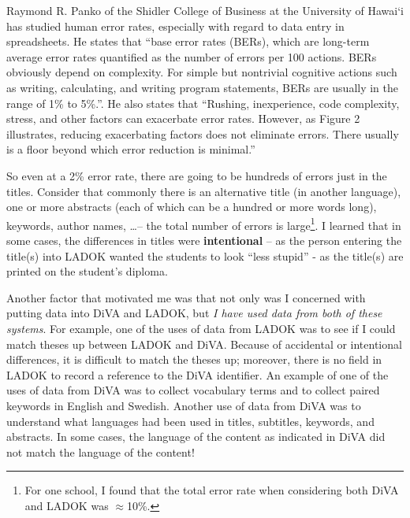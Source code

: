 \documentclass[12pt, twoside]{article}
\begin{document}
Raymond R. Panko of the Shidler College of Business at the University of Hawai`i has studied human error rates, especially with regard to data entry in spreadsheets. He states that  \enquote{base error rates (BERs), which are long-term average error rates quantified as the number of errors per 100 actions. BERs obviously depend on complexity. For simple but nontrivial cognitive actions such as writing, calculating, and writing program statements, BERs are usually in the range of 1\% to 5\%.}\cite{Panko2015}. He also states that \enquote{Rushing, inexperience, code complexity, stress, and other factors can exacerbate error rates. However,
as Figure 2 illustrates, reducing exacerbating factors does not eliminate errors. There usually is a floor beyond which error reduction is minimal.}

So even at a 2\% error rate, there are going to be hundreds of errors just in the titles. Consider that commonly there is an alternative title (in another language), one or more abstracts (each of which can be a hundred or more words long), keywords, author names, \ldots -- the total number of errors is large\footnote{For one school, I found that the total error rate when considering both \gls{DiVA} and \gls{LADOK} was $\approx$10\%.}. I learned that in some cases, the differences in titles were \textbf{intentional} -- as the person entering the title(s) into \gls{LADOK} wanted the students to look \enquote{less stupid} - as the title(s) are printed on the student's diploma.


Another factor that motivated me was that not only was I concerned with putting data into \gls{DiVA} and \gls{LADOK}, but \textit{I have used data from both of these systems}. For example, one of the uses of data from \gls{LADOK} was to see if I could match theses up between \gls{LADOK} and \gls{DiVA}. Because of accidental or intentional differences, it is difficult to match the theses up; moreover, there is no field in \gls{LADOK} to record a reference to the \gls{DiVA} identifier. An example of one of the uses of data from \gls{DiVA} was to collect vocabulary terms and to collect paired keywords in English and Swedish. Another use of data from \gls{DiVA} was to understand what languages had been used in titles, subtitles, keywords, and abstracts. In some cases, the language of the content as indicated in \gls{DiVA} did not match the language of the content!
\end{document}
